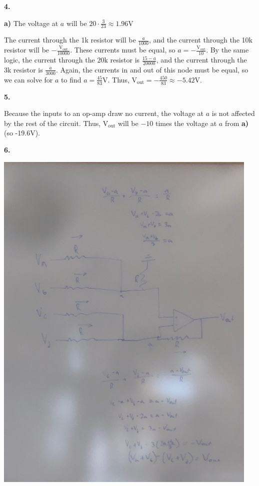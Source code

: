 \documentclass{article}
\begin{document}
\medskip\noindent\textbf{4.}

\medskip\noindent\textbf{a)} The voltage at $a$ will be $20 \cdot \frac{3}{23} \approx 1.96$V

    The current through the 1k resistor will be $\frac{a}{1000}$, and the current through the 10k resistor will be $-\frac{\text{V}_{\text{out}}}{10000}$.
    These currents must be equal, so $a = -\frac{\text{V}_{\text{out}}}{10}$.
    By the same logic, the current through the 20k resistor is $\frac{15-a}{20000}$, and the current through the 3k resistor is $\frac{a}{3000}$.
    Again, the currents in and out of this node must be equal, so we can solve for $a$ to find $a = \frac{45}{83}$V.
    Thus, $\text{V}_{\text{out}} = -\frac{450}{83} \approx -5.42$V.

\medskip\noindent\textbf{5.}
    
    Because the inputs to an op-amp draw no current, the voltage at $a$ is not affected by the rest of the circuit.
    Thus, $\text{V}_{\text{out}}$ will be $-10$ times the voltage at $a$ from \textbf{a)} (so -19.6V).

\newpage\noindent\textbf{6.}

    \begin{center} \includegraphics[angle=270,scale=.75]{1.jpg} \end{center}
\end{document}
